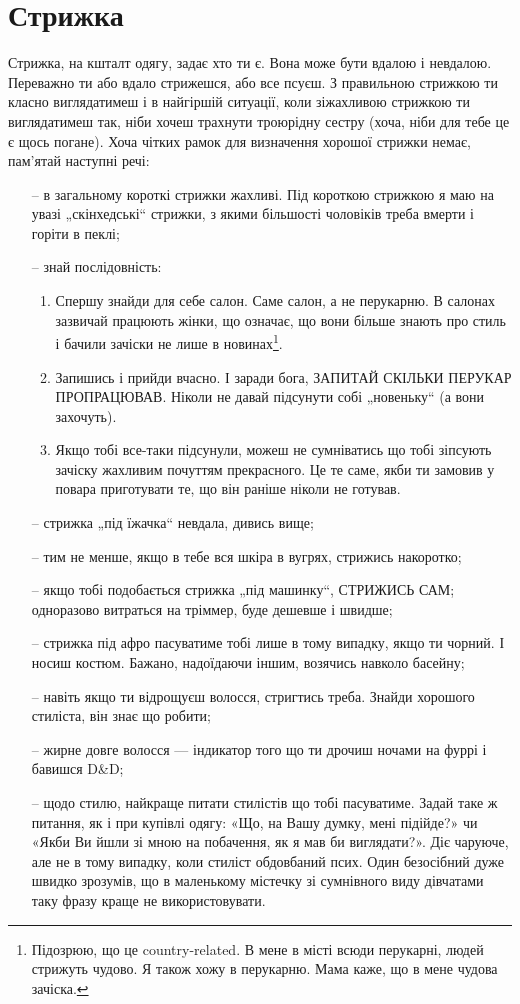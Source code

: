 \section{Стрижка}
Стрижка, на кшталт одягу, задає хто ти є. Вона може бути вдалою і невдалою.
Переважно ти або вдало стрижешся, або все псуєш. З правильною стрижкою ти
класно виглядатимеш і в найгіршій ситуації, коли зіжахливою стрижкою ти
виглядатимеш так, ніби хочеш трахнути троюрідну сестру (хоча, ніби для тебе
це є щось погане). Хоча чітких рамок для визначення хорошої стрижки немає,
пам’ятай наступні речі:

\begin{itemize}
	\item[--] в загальному короткі стрижки жахливі. Під короткою стрижкою
	я маю на увазі „скінхедські“ стрижки, з якими більшості чоловіків треба
	вмерти і горіти в пеклі;
	\item[--] знай послідовність:
	\begin{enumerate}
		\item Спершу знайди для себе салон. Саме салон, а не перукарню. В
		салонах зазвичай працюють жінки, що означає, що вони більше знають про
		стиль і бачили зачіски не лише в новинах\footnote{Підозрюю, що це
		country-related. В мене в місті всюди перукарні, людей стрижуть
		чудово. Я також хожу в перукарню. Мама каже, що в мене чудова
		зачіска.}.
		\item Запишись і прийди вчасно. І заради бога, ЗАПИТАЙ СКІЛЬКИ ПЕРУКАР
		ПРОПРАЦЮВАВ. Ніколи не давай підсунути собі „новеньку“ (а вони
		захочуть).
		\item Якщо тобі все-таки підсунули, можеш не сумніватись що тобі
		зіпсують зачіску жахливим почуттям прекрасного. Це те саме, якби ти
		замовив у повара приготувати те, що він раніше ніколи не готував.
	\end{enumerate}
	\item[--] стрижка „під їжачка“ невдала, дивись вище;
	\item[--] тим не менше, якщо в тебе вся шкіра в вугрях, стрижись накоротко;
	\item[--] якщо тобі подобається стрижка „під машинку“, СТРИЖИСЬ САМ;
	одноразово витраться на тріммер, буде дешевше і швидше;
	\item[--] стрижка під афро пасуватиме тобі лише в тому випадку, якщо ти
	чорний. І носиш костюм. Бажано, надоїдаючи іншим, возячись навколо
	басейну;
	\item[--] навіть якщо ти відрощуєш волосся, стригтись треба. Знайди
	хорошого стиліста, він знає що робити;
	\item[--] жирне довге волосся — індикатор того що ти дрочиш ночами на
	фуррі і бавишся D\&D;
	\item[--] щодо стилю, найкраще питати стилістів що тобі пасуватиме. Задай
	таке ж питання, як і при купівлі одягу: «Що, на Вашу думку, мені підійде?»
	чи «Якби Ви йшли зі мною на побачення, як я мав би виглядати?». Діє
	чаруюче, але не в тому випадку, коли стиліст обдовбаний псих. Один
	безосібний дуже швидко зрозумів, що в маленькому містечку зі сумнівного
	виду дівчатами таку фразу краще не використовувати.
\end{itemize}
